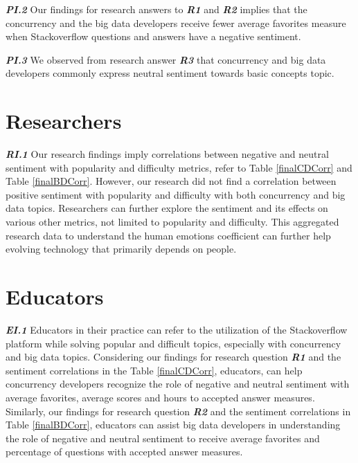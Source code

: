 \emph{\textbf{PI.2}} Our findings for research answers to \emph{\textbf{R1}} and \emph{\textbf{R2}} implies that the concurrency and the big data developers receive fewer average favorites measure when Stackoverflow questions and answers have a negative sentiment.

\emph{\textbf{PI.3}} We observed from research answer \emph{\textbf{R3}} that concurrency and big data developers commonly express neutral sentiment towards basic concepts topic.

\section {Researchers}
\emph{\textbf{RI.1}} Our research findings imply correlations between negative and neutral sentiment with popularity and difficulty metrics, refer to Table \ref{finalCDCorr} and Table \ref{finalBDCorr}. However, our research did not find a correlation between positive sentiment with popularity and difficulty with both concurrency and big data topics. Researchers can further explore the sentiment and its effects on various other metrics, not limited to popularity and difficulty. This aggregated research data to understand the human emotions coefficient can further help evolving technology that primarily depends on people.

\section {Educators}
\emph{\textbf{EI.1}} Educators in their practice can refer to the utilization of the Stackoverflow platform while solving popular and difficult topics, especially with concurrency and big data topics. Considering our findings for research question \emph{\textbf{R1}} and the sentiment correlations in the Table \ref{finalCDCorr}, educators, can help concurrency developers recognize the role of negative and neutral sentiment with average favorites, average scores and hours to accepted answer measures. Similarly, our findings for research question \emph{\textbf{R2}} and the sentiment correlations in Table \ref{finalBDCorr}, educators can assist big data developers in understanding the role of negative and neutral sentiment to receive average favorites and percentage of questions with accepted answer measures.